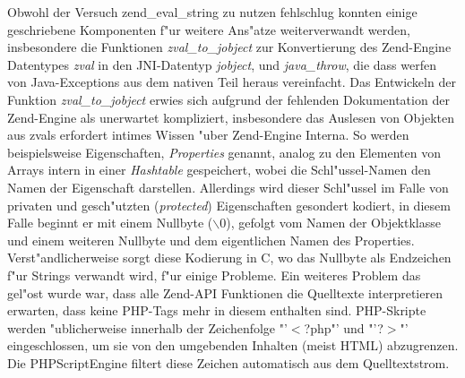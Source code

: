 Obwohl der Versuch zend\_eval\_string zu nutzen fehlschlug konnten einige geschriebene Komponenten f"ur weitere
Ans"atze weiterverwandt werden, insbesondere die Funktionen \emph{zval\_to\_jobject} zur Konvertierung des Zend-Engine
Datentypes \emph{zval} in den JNI-Datentyp \emph{jobject}, und \emph{java\_throw}, die dass werfen von Java-Exceptions
aus dem nativen Teil heraus vereinfacht. 
Das Entwickeln der Funktion \emph{zval\_to\_jobject} erwies sich aufgrund der fehlenden Dokumentation der Zend-Engine als
unerwartet kompliziert, insbesondere das Auslesen von Objekten aus zvals erfordert intimes Wissen "uber Zend-Engine Interna.
So werden beispielsweise Eigenschaften, \emph{Properties} genannt, analog zu den Elementen von Arrays intern 
in einer \emph{Hashtable} gespeichert, wobei die Schl"ussel-Namen den Namen der Eigenschaft darstellen. Allerdings wird
dieser Schl"ussel im Falle von privaten und gesch"utzten (\emph{protected}) Eigenschaften gesondert kodiert, in diesem
Falle beginnt er mit einem Nullbyte ($\backslash$0), gefolgt vom Namen der Objektklasse und einem weiteren Nullbyte und dem eigentlichen
Namen des Properties. Verst"andlicherweise sorgt diese Kodierung in C, wo das Nullbyte als Endzeichen f"ur Strings verwandt wird,
f"ur einige Probleme.
Ein weiteres Problem das gel"ost wurde war, dass alle Zend-API Funktionen die
Quelltexte interpretieren erwarten, dass keine PHP-Tags mehr in diesem enthalten sind. PHP-Skripte werden "ublicherweise
innerhalb der Zeichenfolge "'$<$?php"' und "'?$>$"' eingeschlossen, um sie von den umgebenden Inhalten (meist HTML) abzugrenzen.
Die PHPScriptEngine filtert diese Zeichen automatisch aus dem Quelltextstrom.

